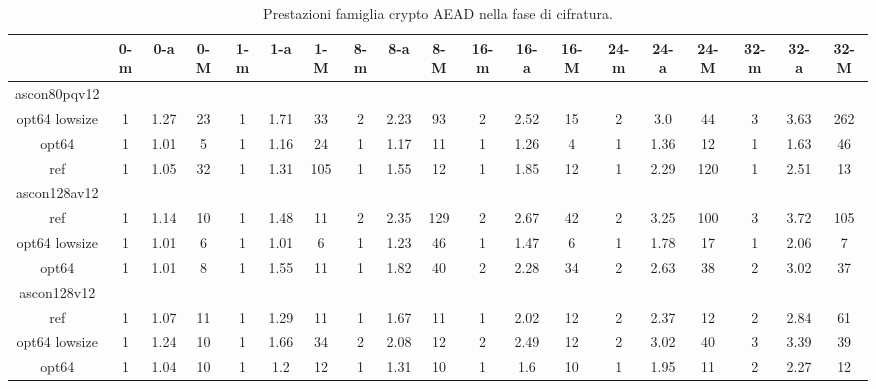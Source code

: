 \begin{landscape}
    \begin{table}[]
        \caption{Prestazioni famiglia crypto AEAD nella fase di cifratura.}
        \begin{adjustbox}{width=600pt}
            \centering
			\begin{tabular}{|c|c|c|c|c|c|c|c|c|c|c|c|c|c|c|c|c|c|c|}
				\hline
				& 0-m & 0-a & 0-M & 1-m & 1-a & 1-M & 8-m & 8-a & 8-M & 16-m & 16-a & 16-M & 24-m & 24-a & 24-M & 32-m & 32-a & 32-M \\
				\hline
				ascon80pqv12 & & & & & & & & & & & & & & & & & & \\
				\hline
				opt64 lowsize & 1 & 1.27 & 23 & 1 & 1.71 & 33 & 2 & 2.23 & 93 & 2 & 2.52 & 15 & 2 & 3.0 & 44 & 3 & 3.63 & 262 \\
				\hline
				opt64 & 1 & 1.01 & 5 & 1 & 1.16 & 24 & 1 & 1.17 & 11 & 1 & 1.26 & 4 & 1 & 1.36 & 12 & 1 & 1.63 & 46 \\
				\hline
				ref & 1 & 1.05 & 32 & 1 & 1.31 & 105 & 1 & 1.55 & 12 & 1 & 1.85 & 12 & 1 & 2.29 & 120 & 1 & 2.51 & 13 \\
				\hline
				ascon128av12 & & & & & & & & & & & & & & & & & & \\
				\hline
				ref & 1 & 1.14 & 10 & 1 & 1.48 & 11 & 2 & 2.35 & 129 & 2 & 2.67 & 42 & 2 & 3.25 & 100 & 3 & 3.72 & 105 \\
				\hline
				opt64 lowsize & 1 & 1.01 & 6 & 1 & 1.01 & 6 & 1 & 1.23 & 46 & 1 & 1.47 & 6 & 1 & 1.78 & 17 & 1 & 2.06 & 7 \\
				\hline
				opt64 & 1 & 1.01 & 8 & 1 & 1.55 & 11 & 1 & 1.82 & 40 & 2 & 2.28 & 34 & 2 & 2.63 & 38 & 2 & 3.02 & 37 \\
				\hline
				ascon128v12 & & & & & & & & & & & & & & & & & & \\
				\hline
				ref & 1 & 1.07 & 11 & 1 & 1.29 & 11 & 1 & 1.67 & 11 & 1 & 2.02 & 12 & 2 & 2.37 & 12 & 2 & 2.84 & 61 \\
				\hline
				opt64 lowsize & 1 & 1.24 & 10 & 1 & 1.66 & 34 & 2 & 2.08 & 12 & 2 & 2.49 & 12 & 2 & 3.02 & 40 & 3 & 3.39 & 39 \\
				\hline
				opt64 & 1 & 1.04 & 10 & 1 & 1.2 & 12 & 1 & 1.31 & 10 & 1 & 1.6 & 10 & 1 & 1.95 & 11 & 2 & 2.27 & 12 \\
				\hline
			\end{tabular}
		\end{adjustbox}
	\end{table}
\end{landscape}

